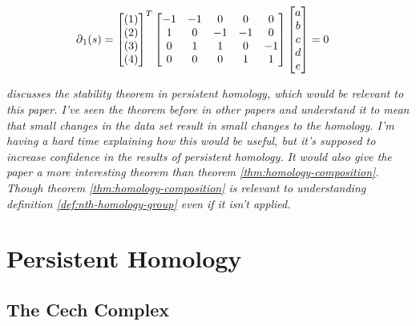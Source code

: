 {\begin{example}
    \begin{align*}
        \operatorname{\partial}_1(s) &=
            \begin{bmatrix}
                (1)\\(2)\\(3)\\(4)\\
            \end{bmatrix}^T
            \begin{bmatrix}
                -1 & -1 &  0 &  0 &  0 \\
                 1 &  0 & -1 & -1 &  0 \\
                 0 &  1 &  1 &  0 & -1 \\
                 0 &  0 &  0 &  1 &  1 \\
            \end{bmatrix}
            \begin{bmatrix}
                a\\b\\c\\d\\e\\
            \end{bmatrix}
            = 0
    \end{align*}

\end{example}

\textit{\cite{cohen-steiner} discusses the stability theorem in persistent homology, which would be relevant to this paper. I've seen the theorem before in other papers and understand it to mean that small changes in the data set result in small changes to the homology. I'm having a hard time explaining how this would be useful, but it's supposed to increase confidence in the results of persistent homology. It would also give the paper a more interesting theorem than theorem \ref{thm:homology-composition}. Though theorem \ref{thm:homology-composition} is relevant to understanding definition \ref{def:nth-homology-group} even if it isn't applied.}

\section{Persistent Homology}\label{sec:persistent-homology}

\subsection{The Cech Complex}\label{sec:cech-complex}

}

